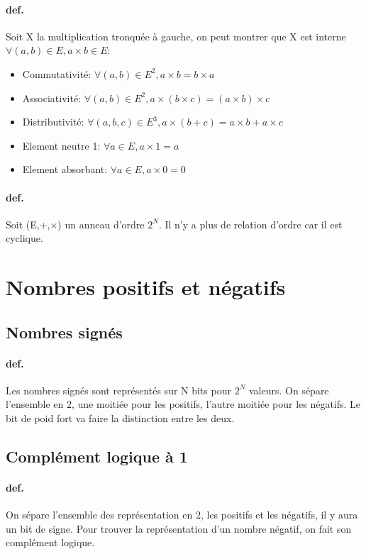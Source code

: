\documentclass{report}
\begin{document}
  \paragraph{def.} Soit X la multiplication tronquée à gauche, on peut montrer que X est interne $\forall (a,b) \in E, a \times b \in E$:
  \begin{itemize}
    \item Commutativité: $\forall (a,b) \in E^{2}, a \times b = b \times a$
    \item Associativité: $\forall (a,b) \in E^{2}, a \times (b \times c) = (a \times b) \times c$
    \item Distributivité: $\forall (a, b, c) \in E^{3}, a \times (b + c) = a \times b + a \times c$
    \item Element neutre 1: $\forall a \in E, a \times 1 = a$
    \item Element absorbant: $\forall a \in E, a \times 0 = 0$
  \end{itemize}

  \paragraph{def.} Soit (E,+,$\times$) un anneau d'ordre $2^N$. Il n'y a plus de relation d'ordre car il est cyclique.

\section{Nombres positifs et négatifs}

  \subsection{Nombres signés}

    \paragraph{def.} Les nombres signés sont représentés sur N bits pour $2^{N}$ valeurs. On sépare l'ensemble en 2, une moitiée pour les positifs, l'autre moitiée pour les négatifs. Le bit de poid fort va faire la distinction entre les deux.

  \subsection{Complément logique à 1}

    \paragraph{def.} On sépare l'ensemble des représentation en 2, les positifs et les négatifs, il y aura un bit de signe. Pour trouver la représentation d'un nombre négatif, on fait son complément logique.
\end{document}
